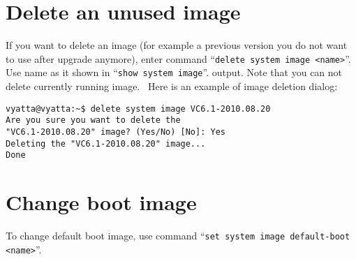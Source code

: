 \section{Delete an unused image}
If you want to delete an image (for example a previous version you do not want to use after upgrade anymore),
enter command ``\texttt{delete system image <name>}''. Use name as it shown in ``\texttt{show system image}''.
output. Note that you can not delete currently running image. \ 
Here is an example of image deletion dialog:
\begin{verbatim}
vyatta@vyatta:~$ delete system image VC6.1-2010.08.20 
Are you sure you want to delete the
"VC6.1-2010.08.20" image? (Yes/No) [No]: Yes
Deleting the "VC6.1-2010.08.20" image...
Done
\end{verbatim}

\section{Change boot image}
To change default boot image, use command ``\texttt{set system image default-boot <name>}''.
